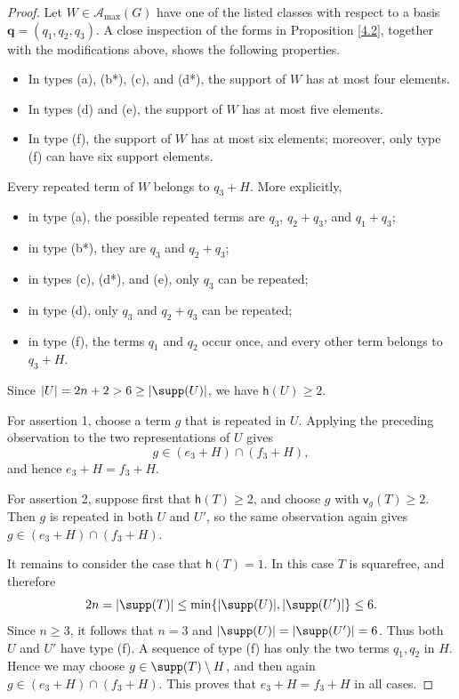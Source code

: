 \documentclass[a4paper, 10pt]{amsart}
\theoremstyle{plain}
\theoremstyle{definition}
\numberwithin{equation}{section}
\begin{document}
{\begin{proof}
Let $W\in\mathcal A_{\max}(G)$ have one of the listed classes with respect to a basis $\boldsymbol q=(q_1,q_2,q_3)$. A close inspection of the forms in Proposition \ref{4.2}, together with the modifications above, shows the following properties.
	\begin{itemize}
		\item In types (a), (b*), (c), and (d*), the support of $W$ has at most four elements.
		\item In types (d) and (e), the support of $W$ has at most five elements.
		\item In type (f), the support of $W$ has at most six elements; moreover, only type (f) can have six support elements.
	\end{itemize}
	Every repeated term of $W$ belongs to $q_3+H$. More explicitly,
	\begin{itemize}
		\item in type (a), the possible repeated terms are $q_3$, $q_2+q_3$, and $q_1+q_3$;
		\item in type (b*), they are $q_3$ and $q_2+q_3$;
		\item in types (c), (d*), and (e), only $q_3$ can be repeated;
		\item in type (d), only $q_3$ and $q_2+q_3$ can be repeated;
		\item in type (f), the terms $q_1$ and $q_2$ occur once, and every other term belongs to $q_3+H$.
	\end{itemize}
	Since $|U|=2n+2>6\ge|\supp(U)|$, we have $\mathsf h(U)\ge2$.

For assertion 1, choose a term $g$ that is repeated in $U$. Applying the preceding observation to the two representations of $U$ gives
	\[
	g\in(e_3+H)\cap(f_3+H),
	\]
	and hence $e_3+H=f_3+H$.

	For assertion 2, suppose first that $\mathsf h(T)\ge2$, and choose $g$ with $\mathsf v_g(T)\ge2$. Then $g$ is repeated in both $U$ and $U'$, so the same observation again gives $g\in(e_3+H)\cap(f_3+H)$.

	It remains to consider the case that $\mathsf h(T)=1$. In this case $T$ is squarefree, and therefore
	\[
	2n=|\supp(T)|\le\min\{|\supp(U)|,|\supp(U')|\}\le6.
	\]
	Since $n\ge3$, it follows that $n=3$ and $|\supp(U)|=|\supp(U')|=6$. Thus both $U$ and $U'$ have type (f). A sequence of type (f) has only the two terms $q_1,q_2$ in $H$. Hence we may choose $g\in\supp(T)\setminus H$, and then again $g\in(e_3+H)\cap(f_3+H)$. This proves that  $e_3+H=f_3+H$ in all cases.


\end{proof}}
\end{document}
